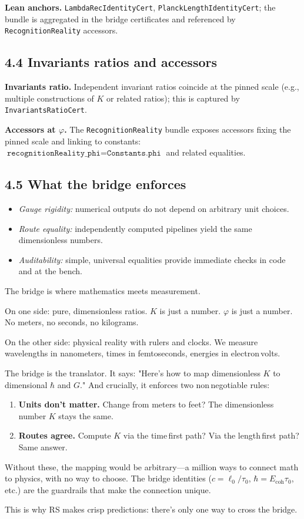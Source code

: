 \documentclass[11pt]{article}
\begin{document}
\textbf{Lean anchors.} \texttt{LambdaRecIdentityCert}, \texttt{PlanckLengthIdentityCert}; the bundle is aggregated in the bridge certificates and referenced by \texttt{RecognitionReality} accessors.

\subsection*{4.4 Invariants ratios and accessors}
\textbf{Invariants ratio.} Independent invariant ratios coincide at the pinned scale (e.g., multiple constructions of $K$ or related ratios); this is captured by \texttt{InvariantsRatioCert}.

\textbf{Accessors at $\varphi$.} The \texttt{RecognitionReality} bundle exposes accessors fixing the pinned scale and linking to constants: $\texttt{recognitionReality\_phi} = \texttt{Constants.phi}$ and related equalities.

\subsection*{4.5 What the bridge enforces}
\begin{itemize}[leftmargin=*]
  \item \emph{Gauge rigidity:} numerical outputs do not depend on arbitrary unit choices.
  \item \emph{Route equality:} independently computed pipelines yield the same dimensionless numbers.
  \item \emph{Auditability:} simple, universal equalities provide immediate checks in code and at the bench.
\end{itemize}

\begin{intuitionbox}
The bridge is where mathematics meets measurement.

On one side: pure, dimensionless ratios. $K$ is just a number. $\varphi$ is just a number. No meters, no seconds, no kilograms.

On the other side: physical reality with rulers and clocks. We measure wavelengths in nanometers, times in femtoseconds, energies in electron\,volts.

The bridge is the translator. It says: "Here's how to map dimensionless $K$ to dimensional $\hbar$ and $G$." And crucially, it enforces two non\,negotiable rules:
\begin{enumerate}
  \item \textbf{Units don't matter.} Change from meters to feet? The dimensionless number $K$ stays the same.
  \item \textbf{Routes agree.} Compute $K$ via the time\,first path? Via the length\,first path? Same answer.
\end{enumerate}

Without these, the mapping would be arbitrary—a million ways to connect math to physics, with no way to choose. The bridge identities ($c=\ell_0/\tau_0$, $\hbar=E_{\mathrm{coh}}\tau_0$, etc.) are the guardrails that make the connection unique.

This is why RS makes crisp predictions: there's only one way to cross the bridge.
\end{intuitionbox}
\end{document}
